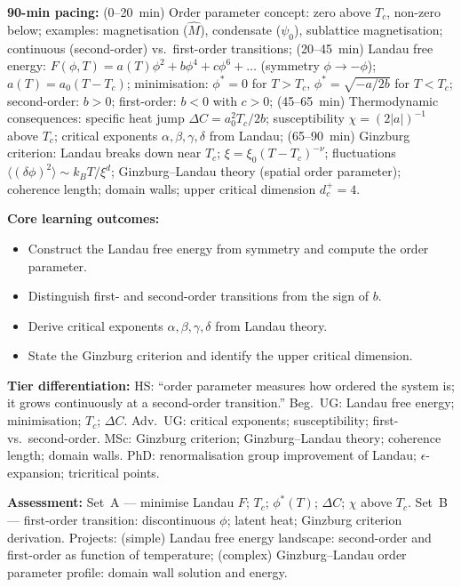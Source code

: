 \documentclass[11pt,a4paper]{article}
\begin{document}
\medskip

\begin{tcolorbox}[modulebox, title={Module~II.7 / L08: Phase Transitions I --- Landau Theory}]
\textbf{90-min pacing:} (0--20~min) Order parameter concept: zero above $T_c$, non-zero below; examples: magnetisation ($\hat{M}$), condensate ($\psi_0$), sublattice magnetisation; continuous (second-order) vs.\ first-order transitions; (20--45~min) Landau free energy: $F(\phi,T)=a(T)\phi^2+b\phi^4+c\phi^6+\ldots$ (symmetry $\phi\to-\phi$); $a(T)=a_0(T-T_c)$; minimisation: $\phi^*=0$ for $T>T_c$, $\phi^*=\sqrt{-a/2b}$ for $T<T_c$; second-order: $b>0$; first-order: $b<0$ with $c>0$; (45--65~min) Thermodynamic consequences: specific heat jump $\Delta C=a_0^2T_c/2b$; susceptibility $\chi=(2|a|)^{-1}$ above $T_c$; critical exponents $\alpha,\beta,\gamma,\delta$ from Landau; (65--90~min) Ginzburg criterion: Landau breaks down near $T_c$; $\xi=\xi_0(T-T_c)^{-\nu}$; fluctuations $\langle(\delta\phi)^2\rangle\sim k_BT/\xi^d$; Ginzburg--Landau theory (spatial order parameter); coherence length; domain walls; upper critical dimension $d_c^+=4$.

\medskip\textbf{Core learning outcomes:}
\begin{itemize}[leftmargin=1.4em,topsep=2pt,itemsep=1pt]
  \item Construct the Landau free energy from symmetry and compute the order parameter.
  \item Distinguish first- and second-order transitions from the sign of $b$.
  \item Derive critical exponents $\alpha,\beta,\gamma,\delta$ from Landau theory.
  \item State the Ginzburg criterion and identify the upper critical dimension.
\end{itemize}

\medskip\textbf{Tier differentiation:}
HS: ``order parameter measures how ordered the system is; it grows continuously at a second-order transition.''
Beg.\ UG: Landau free energy; minimisation; $T_c$; $\Delta C$.
Adv.\ UG: critical exponents; susceptibility; first- vs.\ second-order.
MSc: Ginzburg criterion; Ginzburg--Landau theory; coherence length; domain walls.
PhD: renormalisation group improvement of Landau; $\epsilon$-expansion; tricritical points.

\medskip\textbf{Assessment:}
Set~A --- minimise Landau $F$; $T_c$; $\phi^*(T)$; $\Delta C$; $\chi$ above $T_c$.
Set~B --- first-order transition: discontinuous $\phi$; latent heat; Ginzburg criterion derivation.
Projects: (simple) Landau free energy landscape: second-order and first-order as function of temperature;
(complex) Ginzburg--Landau order parameter profile: domain wall solution and energy.
\end{tcolorbox}
\end{document}
